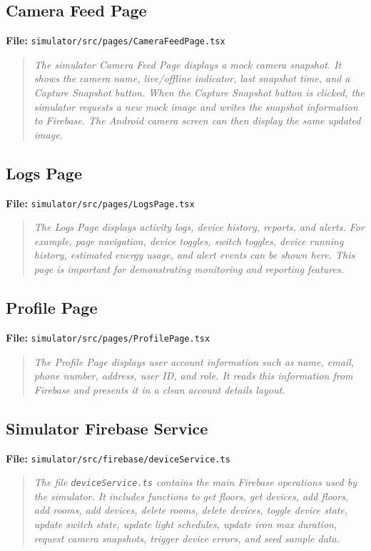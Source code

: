 \documentclass[11pt,a4paper]{article}
\begin{document}
\subsection{Camera Feed Page}
\textbf{File:} \texttt{simulator/src/pages/CameraFeedPage.tsx}

\begin{quote}
\textit{The simulator Camera Feed Page displays a mock camera snapshot. It shows the camera name, live/offline indicator, last snapshot time, and a Capture Snapshot button. When the Capture Snapshot button is clicked, the simulator requests a new mock image and writes the snapshot information to Firebase. The Android camera screen can then display the same updated image.}
\end{quote}

\subsection{Logs Page}
\textbf{File:} \texttt{simulator/src/pages/LogsPage.tsx}

\begin{quote}
\textit{The Logs Page displays activity logs, device history, reports, and alerts. For example, page navigation, device toggles, switch toggles, device running history, estimated energy usage, and alert events can be shown here. This page is important for demonstrating monitoring and reporting features.}
\end{quote}

\subsection{Profile Page}
\textbf{File:} \texttt{simulator/src/pages/ProfilePage.tsx}

\begin{quote}
\textit{The Profile Page displays user account information such as name, email, phone number, address, user ID, and role. It reads this information from Firebase and presents it in a clean account details layout.}
\end{quote}

\subsection{Simulator Firebase Service}
\textbf{File:} \texttt{simulator/src/firebase/deviceService.ts}

\begin{quote}
\textit{The file \texttt{deviceService.ts} contains the main Firebase operations used by the simulator. It includes functions to get floors, get devices, add floors, add rooms, add devices, delete rooms, delete devices, toggle device state, update switch state, update light schedules, update iron max duration, request camera snapshots, trigger device errors, and seed sample data.}
\end{quote}
\end{document}
